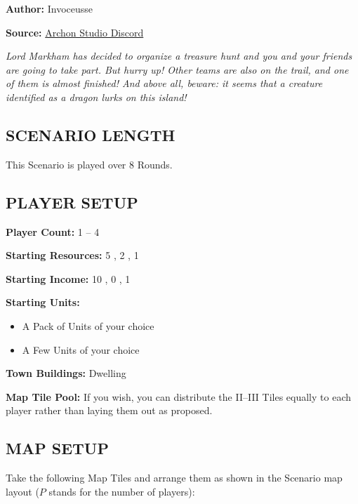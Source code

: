 
\begin{multicols*}{2}

\textbf{Author:} Invoceusse

\textbf{Source:} \href{https://discord.com/channels/740870068178649108/1222679455261261986}{Archon Studio Discord}

\textit{Lord Markham has decided to organize a treasure hunt and you and your friends are going to take part.
  But hurry up! Other teams are also on the trail, and one of them is almost finished!
  And above all, beware: it seems that a creature identified as a dragon lurks on this island!}
\subsection*{\MakeUppercase{Scenario Length}}

This Scenario is played over 8 Rounds.

\subsection*{\MakeUppercase{Player Setup}}

\textbf{Player Count:} 1 -- 4

\textbf{Starting Resources:} 5 , 2 , 1 

\textbf{Starting Income:} 10 , 0 , 1 

\textbf{Starting Units:}
\begin{itemize}
  \item A Pack of  Units of your choice
  \item A Few  Units of your choice
\end{itemize}

\textbf{Town Buildings:}  Dwelling

\textbf{Map Tile Pool:} If you wish, you can distribute the II--III Tiles equally to each player rather than laying them out as proposed.

\subsection*{\MakeUppercase{Map Setup}}

Take the following Map Tiles and arrange them as shown in the Scenario map layout ($P$ stands for the number of players):


\end{multicols*}
